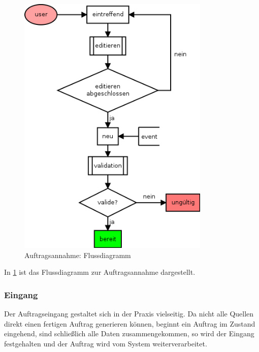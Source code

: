\begin{figure}[ht]
  \centering
  \includegraphics[height=5in]{imageinput/lebenszyklus-auftrag-eingang.png}
  \caption{Auftragsannahme: Flussdiagramm}
  \label{fig:lebenszyklus-auftrag-eingang}
\end{figure}

In \cref{fig:lebenszyklus-auftrag-eingang} ist das Flussdiagramm zur Auftragsannahme dargestellt.

\subsubsection{Eingang}

Der Auftragseingang gestaltet sich in der Praxis vielseitig.
Da nicht alle Quellen direkt einen fertigen Auftrag generieren können,
beginnt ein Auftrag im Zustand eingehend, sind schließlich alle Daten zusammengekommen,
so wird der Eingang festgehalten und der Auftrag wird vom System weiterverarbeitet.

